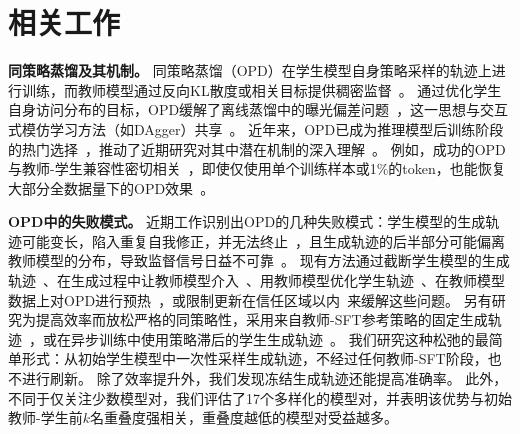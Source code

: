 \vspace{-2mm}
\section{相关工作}
\vspace{-2mm}
\label{sec:related}

\textbf{同策略蒸馏及其机制。}
同策略蒸馏（OPD）在学生模型自身策略采样的轨迹上进行训练，而教师模型通过反向KL散度或相关目标提供稠密监督~\citep{agarwal2024policy,gu2024minillm,lu2025onpolicydistillation, song2026survey}。
通过优化学生自身访问分布的目标，OPD缓解了离线蒸馏中的曝光偏差问题~\citep{hinton2015distillingknowledgeneuralnetwork, kim2016sequence}，这一思想与交互式模仿学习方法（如DAgger）共享~\citep{ross2011reduction}。
近年来，OPD已成为推理模型后训练阶段的热门选择~\citep{xiao2026mimov2flashtechnicalreport,qwen3,xu2026deepseek,team2026kimi}，推动了近期研究对其中潜在机制的深入理解~\citep{jin2026entropy, fu2026revisiting, armandpour2026unmasking}。
例如，成功的OPD与教师-学生兼容性密切相关~\citep{li2026rethinking}，即使仅使用单个训练样本或1\%的token，也能恢复大部分全数据量下的OPD效果~\citep{fu2026rethinkingii, sheng20261}。

\textbf{OPD中的失败模式。}
近期工作识别出OPD的几种失败模式：学生模型的生成轨迹可能变长，陷入重复自我修正，并无法终止~\citep{luo2026demystifying,yang2026eos,fu2026revisiting,yu2026mismatch}，且生成轨迹的后半部分可能偏离教师模型的分布，导致监督信号日益不可靠~\citep{ziheng2026less,xu2026pass,jiang2026trajectory,wang2026demystifying}。
现有方法通过截断学生模型的生成轨迹~\citep{zhang2026fast,ziheng2026less}、在生成过程中让教师模型介入~\citep{xuspeculative,xu2026pass}、用教师模型优化学生轨迹~\citep{jiang2026trajectory}、在教师模型数据上对OPD进行预热~\citep{li2026rethinking}，或限制更新在信任区域以内~\citep{xing2026trust,xie2026trust}来缓解这些问题。
另有研究为提高效率而放松严格的同策略性，采用来自教师-SFT参考策略的固定生成轨迹~\citep{wu2026lightning,wu2026lightningii}，或在异步训练中使用策略滞后的学生生成轨迹~\citep{kang2026asyncopd}。
我们研究这种松弛的最简单形式：从初始学生模型中一次性采样生成轨迹，不经过任何教师-SFT阶段，也不进行刷新。
除了效率提升外，我们发现冻结生成轨迹还能提高准确率。
此外，不同于仅关注少数模型对，我们评估了17个多样化的模型对，并表明该优势与初始教师-学生前$k$名重叠度强相关，重叠度越低的模型对受益越多。



